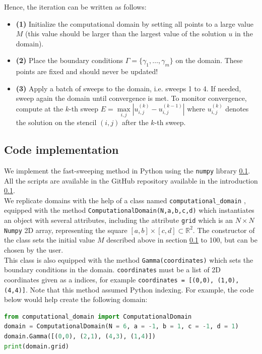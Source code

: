 \documentclass[11pt]{article}
\theoremstyle{definition}
\theoremstyle{remark}
\newcommand{\R}{\mathbb{R}}
\begin{document}
Hence, the iteration can be written as follows:
\begin{itemize}
    \item \textbf{(1)} Initialize the computational domain by setting all points to a large value $M$ (this value should be larger than the largest value of the solution $u$ in the domain).
    \item \textbf{(2)} Place the boundary conditions $\Gamma=\{\gamma_1,\dots,\gamma_m\}$ on the domain. These points are fixed and should never be updated!
    \item \textbf{(3)} Apply a batch of sweeps to the domain, i.e. sweeps 1 to 4. If needed, sweep again the domain until convergence is met. To monitor convergence, compute at the $k$-th sweep $E = \max\limits_{i,j} \left| u_{i,j}^{(k)} - u_{i,j}^{(k-1)} \right|$ where $u_ {i,j}^{(k)}$ denotes the solution on the stencil $(i,j)$ after the $k$-th sweep.
\end{itemize}

\subsection{Code implementation}
We implement the fast-sweeping method in Python using the \texttt{numpy} library \ref{}. All the scripts are available in the GitHub repository available in the introduction \ref{}. \\
We replicate domains with the help of a class named \texttt{computational\_domain}
, equipped with the method \texttt{ComputationalDomain(N,a,b,c,d)} which instantiates an object with several attributes, including the attribute \texttt{grid} which is an $N\times N$ \texttt{Numpy} 2D array, representing the square $[a,b]\times[c,d]\subset\R^2$. The constructor of the class sets the initial value $M$ described above in section \ref{} to 100, but can be chosen by the user.\\
This class is also equipped with the method \texttt{Gamma(coordinates)} which sets the boundary conditions in the domain. \texttt{coordinates} must be a list of 2D coordinates given as a indices, for example \texttt{coordinates = [(0,0), (1,0), (4,4)]}. Note that this method assumed Python indexing. For example, the code below would help create the following domain: \\
\begin{lstlisting}[language=Python, caption=Instance of computational domain, label=lst:fsweep]
from computational_domain import ComputationalDomain
domain = ComputationalDomain(N = 6, a = -1, b = 1, c = -1, d = 1)
domain.Gamma([(0,0), (2,1), (4,3), (1,4)])
print(domain.grid)
\end{lstlisting} \\
\end{document}
